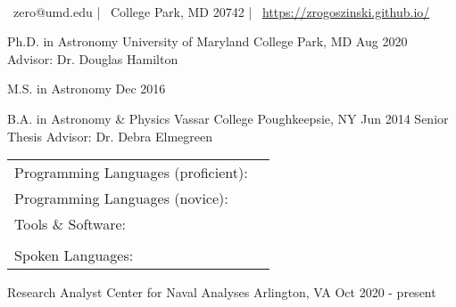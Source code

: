 \documentclass[]{awesome-cv}
\newcommand{\changeurlcolor}[1]{\hypersetup{urlcolor=#1}}
\begin{document}
    
\begin{center}
	  \\
	\vspace{2mm}
	{\faEnvelope\ zero@umd.edu} | {\faMapMarker\ College Park, MD 20742} | {\faLink\ \changeurlcolor{black}\href{https://zrogoszinski.github.io/}{https://zrogoszinski.github.io/}}
\end{center}
\begin{cventries}
	\cventry
	{Ph.D. in Astronomy}
	{University of Maryland}
	{College Park, MD}
	{Aug 2020}
	{Advisor: Dr. Douglas Hamilton}
	
	\vspace{-2mm}
	\cventry
	{M.S. in Astronomy}
	{}
	{}
	{Dec 2016}
	{}
	
	\vspace{-5mm}
	\cventry
	{B.A. in Astronomy \& Physics}
	{Vassar College}
	{Poughkeepsie, NY}
	{Jun 2014}
	{Senior Thesis Advisor: Dr. Debra Elmegreen}
\end{cventries}

\vspace{-2mm}

\begin{cventries}
	\cventry
	{}
	{\def\arraystretch{1.15}{\begin{tabular}{ l l }
		Programming Languages (proficient):  & {\skill{ Python, C, \LaTeX, Mathematica, shell scripting}} \\
		Programming Languages (novice):  & {\skill{ HTML/CSS}} \\
		Tools \& Software:  & {\skill{ HDF5, Numpy, Matplotlib, Pandas, Scikit-learn, SciPy, Seaborn}} \\
		& {\skill{ Git, Jupyter Notebook, Microsoft Office, Slurm, Unix/Linux}} \\
		Spoken Languages:  & {\skill{ English (native), Hebrew (advanced)}}
		\end{tabular}}}
	{}
	{}
	{}
\end{cventries}

\vspace{-9mm}

\begin{cventries}
	\cventry
	{Research Analyst}
	{Center for Naval Analyses}
	{Arlington, VA}
	{Oct 2020 - present}
	{}
\end{cventries}
\end{document}
